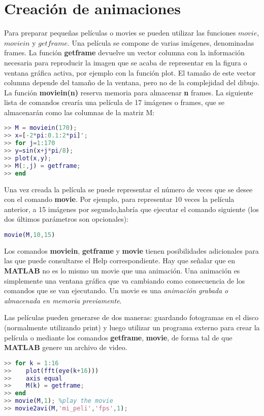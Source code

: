 \chapter{Creación de animaciones}

Para preparar pequeñas películas o movies se pueden utilizar las funciones $movie$, $moviein$ y $getframe$. Una película se compone de varias imágenes, denominadas frames. La función \textbf{getframe}  devuelve un vector columna con la información necesaria para reproducir la imagen que se acaba de representar en la figura o ventana gráfica activa, por ejemplo con la función plot. El tamaño de este vector columna depende del tamaño de la ventana, pero no de la complejidad del dibujo. La función \textbf{moviein(n)} reserva memoria para almacenar \textbf{n} frames. La siguiente lista de comandos crearía una película de 17 imágenes o frames, que se almacenarán como las columnas de la matriz M:

\begin{lstlisting}[language=Matlab]
>> M = moviein(170);
>> x=[-2*pi:0.1:2*pi]';
>> for j=1:170
>> y=sin(x+j*pi/8);
>> plot(x,y);
>> M(:,j) = getframe;
>> end 
\end{lstlisting}

Una vez creada la película se puede representar el número de veces que se desee con el comando \textbf{movie}. Por ejemplo, para representar 10 veces la película anterior, a 15 imágenes por segundo,habría que ejecutar el comando siguiente (los dos últimos parámetros son opcionales): 

\begin{lstlisting}[language=Matlab]
movie(M,10,15)
\end{lstlisting}

Los comandos \textbf{moviein}, \textbf{getframe} y \textbf{movie} tienen posibilidades adicionales para las que puede consultarse el Help correspondiente. Hay que señalar que en \textbf{MATLAB} no es lo mismo un movie que una animación. Una animación es simplemente una ventana gráfica que va cambiando como consecuencia de los comandos que se van ejecutando. Un movie es una \textit{animación grabada o almacenada en memoria previamente}.

Las películas pueden generarse de dos maneras: guardando fotogramas en el disco (normalmente utilizando print) y luego utilizar un programa externo para crear la película o mediante los comandos \textbf{getframe}, \textbf{movie}, de forma tal de que \textbf{MATLAB} genere un archivo de video.
\begin{lstlisting}[language=Matlab]
>> for k = 1:16 
>>    plot(fft(eye(k+16))) 
>>    axis equal 
>>    M(k) = getframe; 
>> end 
>> movie(M,1); %play the movie 
>> movie2avi(M,'mi_peli','fps',1); 
\end{lstlisting}